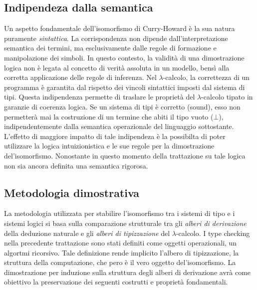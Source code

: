 \subsection{Indipendeza dalla semantica}
Un aspetto fondamentale dell'isomorfismo di Curry-Howard è la sua natura puramente \emph{sintattica}. La corrispondenza non dipende 
dall'interpretazione semantica dei termini, ma esclusivamente dalle regole di formazione e manipolazione dei simboli. In questo contesto, 
la validità di una dimostrazione logica non è legata al concetto di verità assoluta in un modello, bensì alla corretta applicazione delle 
regole di inferenza. Nel $\lambda$-calcolo, la correttezza di un programma è garantita dal rispetto dei vincoli sintattici imposti dal 
sistema di tipi. Questa indipendenza permette di traslare le proprietà del $\lambda$-calcolo tipato in garanzie di coerenza logica. Se un 
sistema di tipi è corretto (sound), esso non permetterà mai la costruzione di un termine che abiti il tipo vuoto ($\bot$), indipendentemente 
dalla semantica operazionale del linguaggio sottostante. L'effetto di maggiore impatto di tale indipendeza è la possibilta di poter utilizzare 
la logica intuizionistica e le sue regole per la dimostrazione del'isomorfismo. Nonostante in questo momento della trattazione su tale logica 
non sia ancora definita una semantica rigorosa. 

\subsection{Metodologia dimostrativa}
La metodologia utilizzata per stabilire l'isomorfismo tra i sistemi di tipo e i sistemi logici si basa sulla comparazione strutturale tra
gli \emph{alberi di derivazione} della deduzione naturale e gli \emph{alberi di tipizzazione} del $\lambda$-calcolo. I type checking nella 
precedente trattazione sono stati definiti come oggetti operazionali, un algortmi ricorsivo. Tale definizione rende implicito l'albero di 
tipizzazione, la struttura della computazione, che pero è il vero oggetto del'isomorfismo. La dimostrazione per induzione sulla struttura 
degli alberi di derivazione avrà come obiettivo la preservazione dei seguenti costrutti e proprietà fondamentali.

